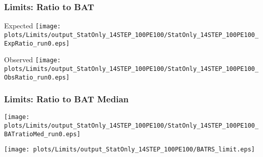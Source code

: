 \begin{frame}
	\frametitle{Limits: Ratio to BAT}
	
		

	\vspace{10pt}
	Expected
	\vspace{10pt}
	\texttt{[image: plots/Limits/output\_StatOnly\_14STEP\_100PE100/StatOnly\_14STEP\_100PE100\_ExpRatio\_run0.eps]}


	
	\vspace{10pt}
	Observed
	\vspace{10pt}
	\texttt{[image: plots/Limits/output\_StatOnly\_14STEP\_100PE100/StatOnly\_14STEP\_100PE100\_ObsRatio\_run0.eps]}


	\cend
	
	
\end{frame}




\begin{frame}
	\frametitle{Limits: Ratio to BAT Median}
	
	
		
	\begin{center}
		\texttt{[image: plots/Limits/output\_StatOnly\_14STEP\_100PE100/StatOnly\_14STEP\_100PE100\_BATratioMed\_run0.eps]}
	\end{center}
	
	
	\begin{center}
		\texttt{[image: plots/Limits/output\_StatOnly\_14STEP\_100PE100/BATRS\_limit.eps]}
	\end{center}
	
	\cend
	
	
	
\end{frame}



